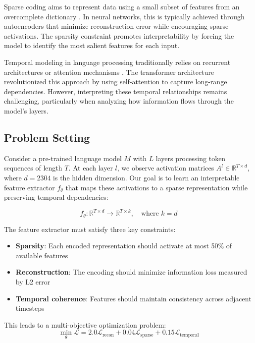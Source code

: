 \documentclass{article} %
\begin{document}
Sparse coding aims to represent data using a small subset of features from an overcomplete dictionary \cite{Gong2015AMS}. In neural networks, this is typically achieved through autoencoders that minimize reconstruction error while encouraging sparse activations. The sparsity constraint promotes interpretability by forcing the model to identify the most salient features for each input.

Temporal modeling in language processing traditionally relies on recurrent architectures or attention mechanisms \cite{bahdanau2014neural}. The transformer architecture \cite{vaswani2017attention} revolutionized this approach by using self-attention to capture long-range dependencies. However, interpreting these temporal relationships remains challenging, particularly when analyzing how information flows through the model's layers.

\subsection{Problem Setting}
\label{subsec:problem}

Consider a pre-trained language model $M$ with $L$ layers processing token sequences of length $T$. At each layer $l$, we observe activation matrices $A^l \in \mathbb{R}^{T \times d}$, where $d=2304$ is the hidden dimension. Our goal is to learn an interpretable feature extractor $f_\theta$ that maps these activations to a sparse representation while preserving temporal dependencies:

\begin{equation}
f_\theta: \mathbb{R}^{T \times d} \rightarrow \mathbb{R}^{T \times k}, \quad \text{where } k=d
\end{equation}

The feature extractor must satisfy three key constraints:
\begin{itemize}
    \item \textbf{Sparsity}: Each encoded representation should activate at most 50\% of available features
    \item \textbf{Reconstruction}: The encoding should minimize information loss measured by L2 error
    \item \textbf{Temporal coherence}: Features should maintain consistency across adjacent timesteps
\end{itemize}

This leads to a multi-objective optimization problem:
\begin{equation}
\min_\theta \mathcal{L} = 2.0\mathcal{L}_\text{recon} + 0.04\mathcal{L}_\text{sparse} + 0.15\mathcal{L}_\text{temporal}
\end{equation}
\end{document}
